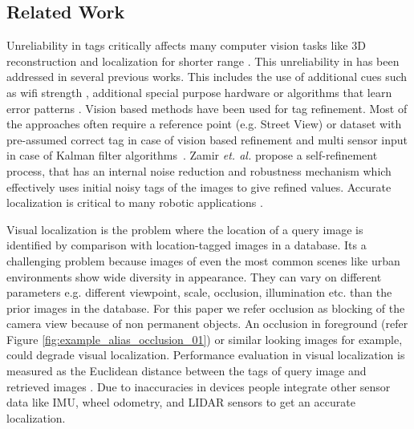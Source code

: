\subsection{Related Work}
\label{sec:related_work}

Unreliability in \gps tags critically affects many computer vision tasks
like 3D reconstruction and localization for shorter 
range \cite{lin2013cross,hafez2013visual}.
This unreliability in \gps has been addressed in several previous 
works\cite{hays2008im2gps}. This includes the use of
additional cues such as wifi strength \cite{martin2010precise}, additional special 
purpose hardware \cite{wei2011intelligent} or algorithms that learn error 
patterns \cite{cummins2008fab}. Vision based methods  have been used for 
\gps tag refinement. Most of the 
approaches often require a reference point (e.g. Street View) or dataset with
pre-assumed correct \gps tag in case of vision based refinement and 
multi sensor input in case of Kalman filter algorithms~\cite{maier2010improved}. 
Zamir {\em et. al.} \cite{Zamir_2014_CVPR}
propose a  self-refinement process,  that has an internal
noise reduction and robustness mechanism which effectively uses initial noisy 
\gps tags of the images to give refined values.
Accurate localization is critical to many robotic 
applications \cite{milford2012seqslam,cummins2011appearance}.

Visual localization is the problem where the location
of a query image is identified by comparison with location-tagged images
in a database. Its a challenging problem
because images of even the most common scenes like
urban environments show wide diversity in appearance. They can vary 
on different parameters e.g. different viewpoint, scale, occlusion, illumination etc. 
than the prior images in the database. For this paper we refer occlusion as blocking of 
the camera view because of non permanent objects. An occlusion in 
foreground (refer Figure \ref{fig:example_alias_occlusion_01}) or similar looking images 
for example, could degrade visual localization. Performance evaluation in visual localization is measured as the 
Euclidean distance between the \gps tags of query image and 
retrieved images \cite{milford2012seqslam}. Due to inaccuracies in \gps devices people integrate other sensor data like IMU, wheel odometry, and LIDAR sensors \cite{levinson2007map,wei2011intelligent} to get an accurate localization. 

